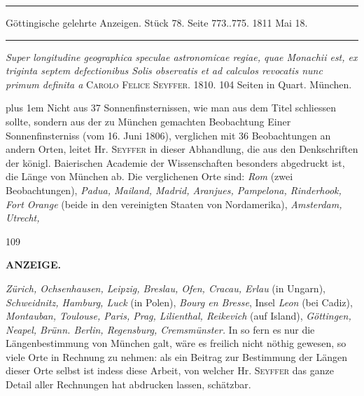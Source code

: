 \par\bigskip
\hypertarget{native-538Seyffer}{}\label{native-538Seyffer}
\begin{center}
\parbox{.92\linewidth}{\centering\small
\rule{\linewidth}{.3pt}\par\smallskip
Göttingische gelehrte Anzeigen. Stück 78. Seite 773..775. 1811 Mai 18.\par\smallskip
\rule{\linewidth}{.3pt}}
\end{center}
\par\medskip

\emph{Super longitudine geographica speculae astronomicae regiae, quae Monachii est, ex triginta septem defectionibus Solis observatis et ad calculos revocatis nunc primum definita a} \textsc{Carolo Felice Seyffer}. 1810. 104 Seiten in Quart. München.

{\rightskip=0pt plus 1em Nicht aus 37 Sonnenfinsternissen, wie man aus dem Titel schliessen sollte, sondern aus der zu München gemachten Beobachtung Einer Sonnenfinsterniss (vom 16. Juni 1806), verglichen mit 36 Beobachtungen an andern Orten, leitet Hr. \textsc{Seyffer} in dieser Abhandlung, die aus den Denkschriften der königl. Baierischen Academie der Wissenschaften besonders abgedruckt ist, die Länge von München ab. Die verglichenen Orte sind: \emph{Rom} (zwei Beobachtungen), \emph{Padua, Mailand, Madrid, Aranjues, Pampelona, Rinderhook, Fort Orange} (beide in den vereinigten Staaten von Nordamerika), \emph{Amsterdam, Utrecht,}\par
\vfill
{}\hfill{\small 109}\hspace*{.18\textwidth}\par
\clearpage
{}
\noindent{}%
\parbox[b]{\dimexpr\textwidth-20mm\relax}{\centering\small\textbf{ANZEIGE.}}%
\makebox[10mm][r]{}\par\nobreak\medskip
\noindent \emph{Zürich, Ochsenhausen, Leipzig, Breslau, Ofen, Cracau, Erlau} (in Ungarn), \emph{Schweidnitz, Hamburg, Luck} (in Polen), \emph{Bourg en Bresse}, Insel \emph{Leon} (bei Cadiz), \emph{Montauban, Toulouse, Paris, Prag, Lilienthal, Reikevich} (auf Island), \emph{Göttingen, Neapel, Brünn. Berlin, Regensburg, Cremsmünster.} In so fern es nur die Längenbestimmung von München galt, wäre es freilich nicht nöthig gewesen, so viele Orte in Rechnung zu nehmen: als ein Beitrag zur Bestimmung der Längen dieser Orte selbst ist indess diese Arbeit, von welcher Hr. \textsc{Seyffer} das ganze Detail aller Rechnungen hat abdrucken lassen, schätzbar.\par}

